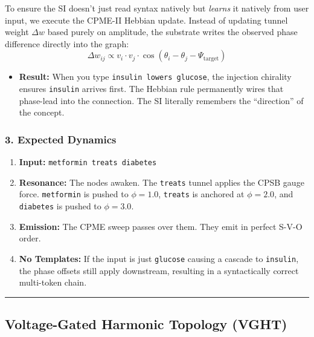 \documentclass[
  11pt,
  a4paper,
]{article}
\providecommand{\tightlist}{%
  \setlength{\itemsep}{0pt}\setlength{\parskip}{0pt}}
\begin{document}
To ensure the SI doesn't just read syntax natively but \emph{learns} it
natively from user input, we execute the CPME-II Hebbian update. Instead
of updating tunnel weight \(\Delta w\) based purely on amplitude, the
substrate writes the observed phase difference directly into the graph:
\[ \Delta w_{ij} \propto v_i \cdot v_j \cdot \cos(\theta_i - \theta_j - \Psi_{\text{target}}) \]

\begin{itemize}
\tightlist
\item
  \textbf{Result:} When you type \texttt{insulin\ lowers\ glucose}, the
  injection chirality ensures \texttt{insulin} arrives first. The
  Hebbian rule permanently wires that phase-lead into the connection.
  The SI literally remembers the ``direction'' of the concept.
\end{itemize}

\subsubsection{3. Expected Dynamics}\label{expected-dynamics-3}

\begin{enumerate}
\def\labelenumi{\arabic{enumi}.}
\tightlist
\item
  \textbf{Input:} \texttt{metformin\ treats\ diabetes}
\item
  \textbf{Resonance:} The nodes awaken. The \texttt{treats} tunnel
  applies the CPSB gauge force. \texttt{metformin} is pushed to
  \(\phi = 1.0\), \texttt{treats} is anchored at \(\phi = 2.0\), and
  \texttt{diabetes} is pushed to \(\phi = 3.0\).
\item
  \textbf{Emission:} The CPME sweep passes over them. They emit in
  perfect S-V-O order.
\item
  \textbf{No Templates:} If the input is just \texttt{glucose} causing a
  cascade to \texttt{insulin}, the phase offsets still apply downstream,
  resulting in a syntactically correct multi-token chain.
\end{enumerate}

\begin{center}\rule{0.5\linewidth}{0.5pt}\end{center}

\newpage

\subsection{Voltage-Gated Harmonic Topology
(VGHT)}\label{voltage-gated-harmonic-topology-vght}
\end{document}
